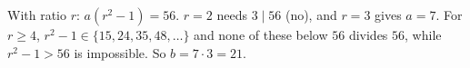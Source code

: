 With ratio $r$: $a(r^2-1)=56$. $r=2$ needs $3\mid56$ (no), and $r=3$ gives $a=7$. For $r\ge4$, $r^2-1\in\{15,24,35,48,\dots\}$ and none of these below $56$ divides $56$, while $r^2-1>56$ is impossible. So $b=7\cdot3=\boxed{21}$.
